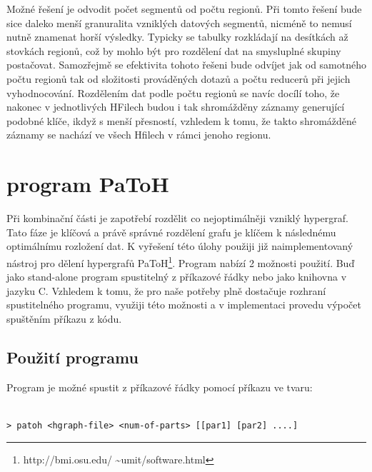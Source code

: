 \documentclass[thesis=M,czech]{FITthesis}[2012/06/26]
\begin{document}
Možné řešení je odvodit počet segmentů od počtu regionů. Při tomto řešení bude sice daleko menší granuralita vzniklých datových segmentů, nicméně to nemusí nutně znamenat horší výsledky. Typicky se tabulky rozkládají na desítkách až stovkách regionů, což by mohlo být pro rozdělení dat na smysluplné skupiny postačovat. Samozřejmě se efektivita tohoto řešeni bude odvíjet jak od samotného počtu regionů tak od složitosti prováděných dotazů a počtu reducerů při jejich vyhodnocování. Rozdělením dat podle počtu regionů se navíc docílí toho, že nakonec v jednotlivých HFilech budou i tak shromážděny záznamy generující podobné klíče, ikdyž s menší přesností, vzhledem k tomu, že takto shromážděné záznamy se nachází ve všech Hfilech v rámci jenoho regionu.





\section{program PaToH}
Při kombinační části je zapotřebí rozdělit co nejoptimálněji vzniklý hypergraf. Tato fáze je klíčová a právě správné rozdělení grafu je klíčem k následnému optimálnímu rozložení dat. K vyřešení této úlohy použiji již naimplementovaný nástroj pro dělení hypergrafů PaToH\footnote{http://bmi.osu.edu/ \textasciitilde umit/software.html}. Program nabízí 2 možnosti použití. Buď jako stand-alone program spustitelný z příkazové řádky nebo jako knihovna v jazyku C. Vzhledem k tomu, že pro naše potřeby plně dostačuje rozhraní spustitelného programu, využiji této možnosti a v implementaci provedu výpočet spuštěním příkazu z kódu. 

\subsection{Použití programu}
Program je možné spustit z příkazové řádky pomocí příkazu ve tvaru:
\medskip
\begin{lstlisting}[frame=single]  % Start your code-block
 
> patoh <hgraph-file> <num-of-parts> [[par1] [par2] ....]

\end{lstlisting}
\medskip
\end{document}
